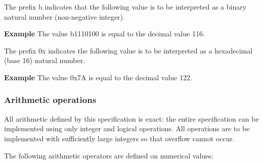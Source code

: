 The prefix b indicates that the following value is to be interpreted as a binary
natural number (non-negative integer). 

{\bf Example} The value b1110100 is equal to the decimal value 116. 

The prefix 0x indicates the following value is to be interpreted as a hexadecimal (base 16)
natural number. 

{\bf Example} The value 0x7A is equal to the decimal value 122. 

\subsubsection{Arithmetic operations}
\label{arithoperations}

All arithmetic defined by this specification is exact: the entire 
specification can be implemented using only integer and logical operations.
All operations are to be implemented with sufficiently large integers so 
that overflow cannot occur.

The following arithmetic operators are defined on numerical values:

